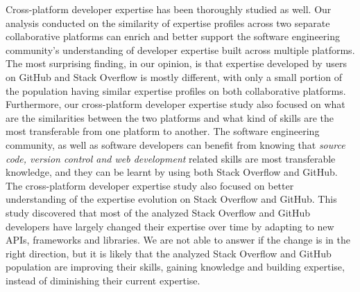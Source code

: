         Cross-platform developer expertise has been thoroughly studied as well. Our analysis conducted on the similarity of expertise profiles across two separate collaborative platforms can enrich and better support the software engineering community's understanding of developer expertise built across multiple platforms. The most surprising finding, in our opinion, is that expertise developed by users on GitHub and Stack Overflow is mostly different, with only a small portion of the population having similar expertise profiles on both collaborative platforms. Furthermore, our cross-platform developer expertise study also focused on what are the similarities between the two platforms and what kind of skills are the most transferable from one platform to another. The software engineering community, as well as software developers can benefit from knowing that \emph{source code, version control and web development} related skills are most transferable knowledge, and they can be learnt by using both Stack Overflow and GitHub. The cross-platform developer expertise study also focused on better understanding of the expertise evolution on Stack Overflow and GitHub. This study discovered that most of the analyzed Stack Overflow and GitHub developers have largely changed their expertise over time by adapting to new APIs, frameworks and libraries. We are not able to answer if the change is in the right direction, but it is likely that the analyzed Stack Overflow and GitHub population are improving their skills, gaining knowledge and building expertise, instead of diminishing their current expertise.
        
